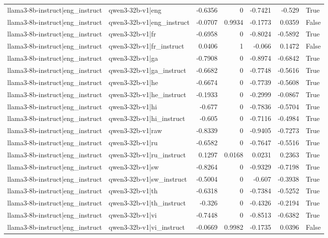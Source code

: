 \begin{table}
\begin{tabular}{l l r r r r l}
llama3-8b-instruct|eng_instruct & qwen3-32b-v1|eng & -0.6356 & 0 & -0.7421 & -0.529 & True \\
llama3-8b-instruct|eng_instruct & qwen3-32b-v1|eng_instruct & -0.0707 & 0.9934 & -0.1773 & 0.0359 & False \\
llama3-8b-instruct|eng_instruct & qwen3-32b-v1|fr & -0.6958 & 0 & -0.8024 & -0.5892 & True \\
llama3-8b-instruct|eng_instruct & qwen3-32b-v1|fr_instruct & 0.0406 & 1 & -0.066 & 0.1472 & False \\
llama3-8b-instruct|eng_instruct & qwen3-32b-v1|ga & -0.7908 & 0 & -0.8974 & -0.6842 & True \\
llama3-8b-instruct|eng_instruct & qwen3-32b-v1|ga_instruct & -0.6682 & 0 & -0.7748 & -0.5616 & True \\
llama3-8b-instruct|eng_instruct & qwen3-32b-v1|he & -0.6674 & 0 & -0.7739 & -0.5608 & True \\
llama3-8b-instruct|eng_instruct & qwen3-32b-v1|he_instruct & -0.1933 & 0 & -0.2999 & -0.0867 & True \\
llama3-8b-instruct|eng_instruct & qwen3-32b-v1|hi & -0.677 & 0 & -0.7836 & -0.5704 & True \\
llama3-8b-instruct|eng_instruct & qwen3-32b-v1|hi_instruct & -0.605 & 0 & -0.7116 & -0.4984 & True \\
llama3-8b-instruct|eng_instruct & qwen3-32b-v1|raw & -0.8339 & 0 & -0.9405 & -0.7273 & True \\
llama3-8b-instruct|eng_instruct & qwen3-32b-v1|ru & -0.6582 & 0 & -0.7647 & -0.5516 & True \\
llama3-8b-instruct|eng_instruct & qwen3-32b-v1|ru_instruct & 0.1297 & 0.0168 & 0.0231 & 0.2363 & True \\
llama3-8b-instruct|eng_instruct & qwen3-32b-v1|sw & -0.8264 & 0 & -0.9329 & -0.7198 & True \\
llama3-8b-instruct|eng_instruct & qwen3-32b-v1|sw_instruct & -0.5004 & 0 & -0.607 & -0.3938 & True \\
llama3-8b-instruct|eng_instruct & qwen3-32b-v1|th & -0.6318 & 0 & -0.7384 & -0.5252 & True \\
llama3-8b-instruct|eng_instruct & qwen3-32b-v1|th_instruct & -0.326 & 0 & -0.4326 & -0.2194 & True \\
llama3-8b-instruct|eng_instruct & qwen3-32b-v1|vi & -0.7448 & 0 & -0.8513 & -0.6382 & True \\
llama3-8b-instruct|eng_instruct & qwen3-32b-v1|vi_instruct & -0.0669 & 0.9982 & -0.1735 & 0.0396 & False \\

\end{tabular}
\end{table}
